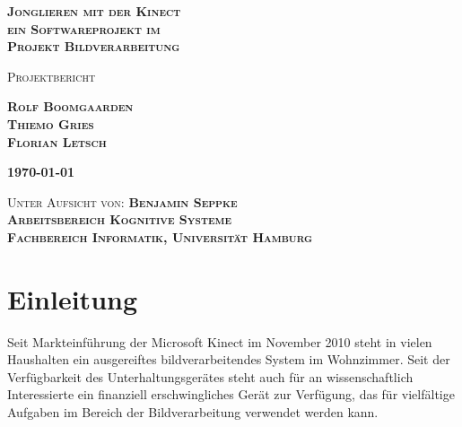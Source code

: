 \documentclass[12pt,a4paper,ngerman]{scrartcl}
\begin{document}
\begin{titlepage}

\vspace*{3 cm}

\begin{flushright}

\bfseries{\Huge\scshape Jonglieren mit der Kinect\\{\Large ein Softwareprojekt im}\\\vspace{0.3cm}Projekt Bildverarbeitung}
\end{flushright}

\vspace{2 cm}

\begin{flushright}
\scshape{\large Projektbericht}
\end{flushright}

\begin{flushright}
\scshape{\LARGE\bfseries Rolf Boomgaarden\\}
\scshape{\LARGE\bfseries Thiemo Gries\\}
\scshape{\LARGE\bfseries Florian Letsch\\}
\end{flushright}

\vspace{2 cm}

\begin{flushright}
\scshape{\large\bfseries \today}
\end{flushright}

\vfill

\begin{flushright}

\scshape{Unter Aufsicht von: {\bfseries Benjamin Seppke}\\}
\scshape{\bfseries Arbeitsbereich Kognitive Systeme\\}
\scshape{\bfseries Fachbereich Informatik, Universität Hamburg\\}
\end{flushright}

\end{titlepage}

\tableofcontents
\newpage

\section{Einleitung}

Seit Markteinführung der Microsoft Kinect im November 2010\cite{kinect:wiki} steht in vielen
Haushalten ein ausgereiftes bildverarbeitendes System im Wohnzimmer. Seit der
Verfügbarkeit des Unterhaltungsgerätes steht auch für an
wissenschaftlich Interessierte ein finanziell erschwingliches Gerät zur Verfügung,
das für vielfältige Aufgaben im Bereich der Bildverarbeitung verwendet werden kann.
\end{document}

